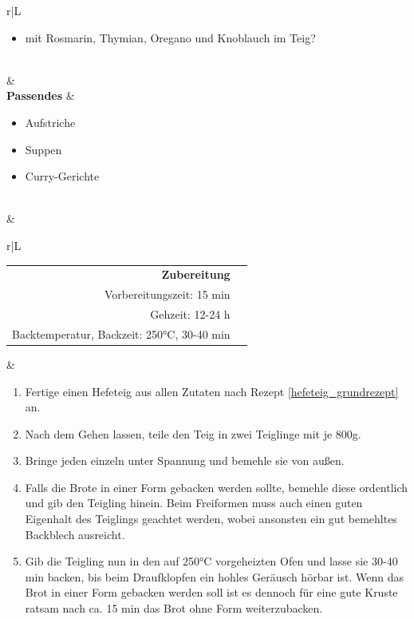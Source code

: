 \documentclass[a4paper, 12pt]{scrbook} 								%
\numberwithin{equation}{section} 									%
\begin{document}
\begin{tabularx}{\textwidth}{r|L}
\begin{itemize}[nosep]
										\item mit Rosmarin, Thymian, Oregano und Knoblauch im Teig?
									\end{itemize}	\\
								&	\\	
		\textbf{Passendes}		&	\begin{itemize}[nosep]
										\item Aufstriche
										\item Suppen
										\item Curry-Gerichte
									\end{itemize}	\\
								&	\\	
		\end{tabularx}
		\newpage
		\begin{tabularx}{\textwidth}{r|L}
	
	
		\begin{tabular}[t]{rr}
			\textbf{Zubereitung}	\\
			Vorbereitungszeit: 15 min	\\
			Gehzeit: 12-24 h	\\
			Backtemperatur, Backzeit: 250°C, 30-40 min \\
		\end{tabular}			&	\begin{enumerate}[nosep]
										\item Fertige einen Hefeteig aus allen Zutaten nach Rezept \ref{hefeteig_grundrezept} an.
										\item Nach dem Gehen lassen, teile den Teig in zwei Teiglinge mit je 800g.
										\item Bringe jeden einzeln unter Spannung und bemehle sie von außen.
										\item Falls die Brote in einer Form gebacken werden sollte, bemehle diese ordentlich und gib den Teigling hinein. Beim Freiformen muss auch einen guten Eigenhalt des Teiglings geachtet werden, wobei ansonsten ein gut bemehltes Backblech ausreicht.
										\item Gib die Teigling nun in den auf 250°C vorgeheizten Ofen und lasse sie 30-40 min backen, bis beim Draufklopfen ein hohles Geräusch hörbar ist. Wenn das Brot in einer Form gebacken werden soll ist es dennoch für eine gute Kruste ratsam nach ca. 15 min das Brot ohne Form weiterzubacken.
									\end{enumerate}	\\
	\end{tabularx}
	\newpage
\end{document}
